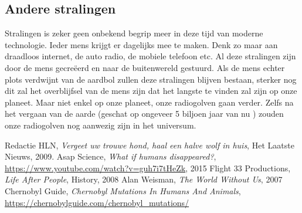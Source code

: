 \subsection{Andere stralingen}
Stralingen is zeker geen onbekend begrip meer in deze tijd van moderne technologie. Ieder mens krijgt er dagelijks mee te maken. Denk zo maar aan draadloos internet, de auto radio, de mobiele telefoon etc. Al deze stralingen zijn door de mens gecre\"{e}erd en naar de buitenwereld gestuurd. 
\newline
Als de mens echter plots verdwijnt van de aardbol zullen deze stralingen blijven bestaan, sterker nog dit zal het overblijfsel van de mens zijn dat het langste te vinden zal zijn op onze planeet. Maar niet enkel op onze planeet, onze radiogolven gaan verder. Zelfs na het vergaan van de aarde (geschat op ongeveer 5 biljoen jaar van nu \cite{WorldWithoutUs}) zouden onze radiogolven nog aanwezig zijn in het universum.
\newpage
\begin{thebibliography}{9}

  Redactie HLN,
  \emph{Vergeet uw trouwe hond, haal een halve wolf in huis},
  Het Laatste Nieuws,
  2009.
  Asap Science,
  \emph{What if humans disappeared?},
  \url{https://www.youtube.com/watch?v=guh7i7tHeZk},
  2015
	Flight 33 Productions,
    \emph{Life After People},
    History,
    2008
	Alan Weisman,
	\emph{The World Without Us},
	2007
	Chernobyl Guide,
	\emph{Chernobyl Mutations In Humans And Animals},
	\url{https://chernobylguide.com/chernobyl_mutations/}
	
\end{thebibliography}


